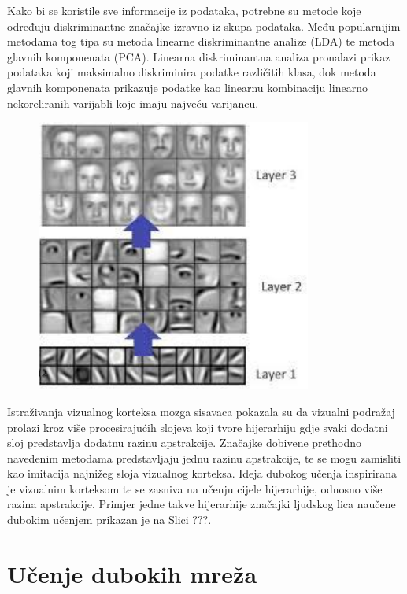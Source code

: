 \documentclass[lmodern, utf8, diplomski, numeric]{fer}
\begin{document}
Kako bi se koristile sve informacije iz podataka, potrebne su metode koje određuju diskriminantne značajke izravno iz skupa podataka. Među popularnijim metodama tog tipa su metoda linearne diskriminantne analize (LDA) te metoda glavnih komponenata (PCA). Linearna diskriminantna analiza pronalazi prikaz podataka koji maksimalno diskriminira podatke različitih klasa, dok metoda glavnih komponenata prikazuje podatke kao linearnu kombinaciju linearno nekoreliranih varijabli koje imaju najveću varijancu.

\begin{figure}[ht!]
\centering
\includegraphics[height=9cm]{slike/feature_hierarchy2.jpeg}
\caption{}
\end{figure}

Istraživanja vizualnog korteksa mozga sisavaca pokazala su da vizualni podražaj prolazi kroz više procesirajućih slojeva koji tvore hijerarhiju gdje svaki dodatni sloj predstavlja dodatnu razinu apstrakcije.  Značajke dobivene prethodno navedenim metodama predstavljaju jednu razinu apstrakcije, te se mogu zamisliti kao imitacija najnižeg sloja vizualnog korteksa. Ideja dubokog učenja inspirirana je vizualnim korteksom te se zasniva na učenju cijele hijerarhije, odnosno više razina apstrakcije. Primjer jedne takve hijerarhije značajki ljudskog lica naučene dubokim učenjem prikazan je na Slici ???.




\section{Učenje dubokih mreža}
\end{document}
